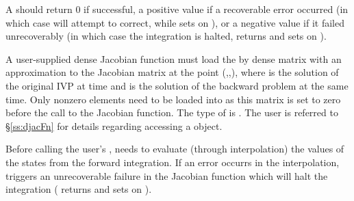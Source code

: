 {
  A  should return 0 if successful, a positive value if a recoverable
  error occurred (in which case {\idas} will attempt to correct, while {\idadense} sets
   on ), or a negative 
  value if it failed unrecoverably (in which case the integration is halted, 
  returns  and {\idadense} sets  on 
  ).
}
{
  A user-supplied dense Jacobian function must load the  by 
  dense matrix  with an approximation to the Jacobian matrix
  at the point (,,), where  is the solution
  of the original IVP at time  and  is the solution of the
  backward problem at the same time.
  Only nonzero elements need to be loaded into  as this matrix 
  is set to zero before the call to the Jacobian function. 
  The type of  is . The user is referred to 
  \S\ref{ss:djacFn} for details regarding accessing a  object.

  {\warn}Before calling the user's , {\idaa} needs to evaluate
  (through interpolation) the values of the states from the forward integration. 
  If an error occurrs in the interpolation, {\idaa} triggers an unrecoverable
  failure in the Jacobian function which will halt the integration
  ( returns  and {\idadense} sets  on 
  ).
}

